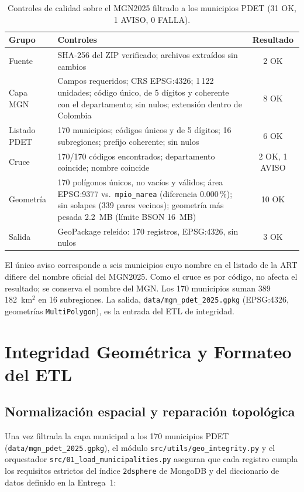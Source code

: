 \documentclass[12pt, letterpaper]{article}
\begin{document}
\begin{table}[H]
\centering
\small
{}
\begin{tabularx}{\textwidth}{l X c}
\toprule
\textbf{Grupo} & \textbf{Controles} & \textbf{Resultado} \\
\midrule
Fuente & SHA-256 del ZIP verificado; archivos extraídos sin cambios & 2 OK \\
Capa MGN & Campos requeridos; CRS EPSG:4326; 1\,122 unidades; código único, de 5 dígitos y coherente con el departamento; sin nulos; extensión dentro de Colombia & 8 OK \\
Listado PDET & 170 municipios; códigos únicos y de 5 dígitos; 16 subregiones; prefijo coherente; sin nulos & 6 OK \\
Cruce & 170/170 códigos encontrados; departamento coincide; nombre coincide & 2 OK, 1 AVISO \\
Geometría & 170 polígonos únicos, no vacíos y válidos; área EPSG:9377 vs.\ \texttt{mpio\_narea} (diferencia 0.000\,\%); sin solapes (339 pares vecinos); geometría más pesada 2.2~MB (límite BSON 16~MB) & 10 OK \\
Salida & GeoPackage releído: 170 registros, EPSG:4326, sin nulos & 3 OK \\
\bottomrule
\end{tabularx}
\caption{Controles de calidad sobre el MGN2025 filtrado a los municipios PDET (31 OK, 1 AVISO, 0 FALLA).}
\label{tab:qc_mgn}
\end{table}

El único aviso corresponde a seis municipios cuyo nombre en el listado de la ART difiere del nombre oficial del MGN2025. Como el cruce es por código, no afecta el resultado; se conserva el nombre del MGN. Los 170 municipios suman 389\,182~km$^2$ en 16 subregiones. La salida, \texttt{data/mgn\_pdet\_2025.gpkg} (EPSG:4326, geometrías \texttt{MultiPolygon}), es la entrada del ETL de integridad.

\section{Integridad Geométrica y Formateo del ETL}

\subsection{Normalización espacial y reparación topológica}
Una vez filtrada la capa municipal a los 170 municipios PDET (\texttt{data/mgn\_pdet\_2025.gpkg}), el módulo \texttt{src/utils/geo\_integrity.py} y el orquestador \texttt{src/01\_load\_municipalities.py} aseguran que cada registro cumpla los requisitos estrictos del índice \texttt{2dsphere} de MongoDB y del diccionario de datos definido en la Entrega~1:
\end{document}
